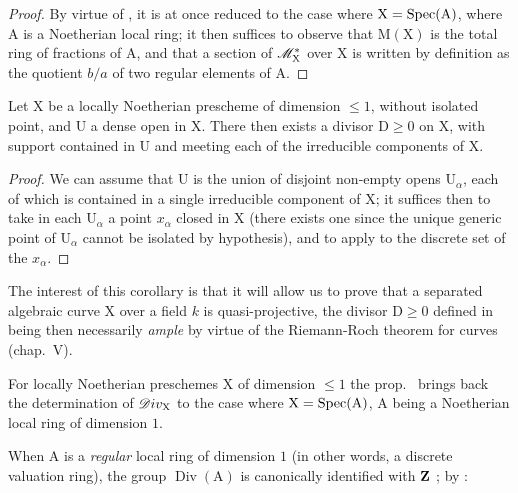 \begin{proof}
By virtue of , it is at once reduced to the case where $\mathrm{X}=\operatorname{Spec}(\mathrm{A})$, where $\mathrm{A}$ is a Noetherian local ring;
it then suffices to observe that $\mathrm{M}(\mathrm{X})$ is the total ring of fractions of $\mathrm{A}$, and that a section of $\mathscr{M}^*_\mathrm{X}$ over $\mathrm{X}$ is written by definition as the quotient $b/a$ of two regular elements of $\mathrm{A}$.
\end{proof}

\begin{corollary}[21.9.7]
\label{IV.21.9.7}
Let $\mathrm{X}$ be a locally Noetherian prescheme of dimension $\leq 1$, without isolated point, and $\mathrm{U}$ a dense open in $\mathrm{X}$.
There then exists a divisor $\mathrm{D}\geq 0$ on $\mathrm{X}$, with support contained in $\mathrm{U}$ and meeting each of the irreducible components of $\mathrm{X}$.
\end{corollary}

\begin{proof}
We can assume that $\mathrm{U}$ is the union of disjoint non-empty opens $\mathrm{U}_\alpha$, each of which is contained in a single irreducible component of $\mathrm{X}$;
it suffices then to take in each $\mathrm{U}_\alpha$ a point $x_\alpha$ closed in $\mathrm{X}$ (there exists one since the unique generic point of $\mathrm{U}_\alpha$ cannot be isolated by hypothesis), and to apply  to the discrete set of the $x_\alpha$.
\end{proof}

The interest of this corollary is that it will allow us to prove that a separated algebraic curve $\mathrm{X}$ over a field $k$ is quasi-projective, the divisor $\mathrm{D}\geq 0$ defined in  being then necessarily \emph{ample} by virtue of the Riemann-Roch theorem for curves (chap.~V).

\begin{env}[21.9.8]
\label{IV.21.9.8}
For locally Noetherian preschemes $\mathrm{X}$ of dimension $\leq 1$ the prop.~ brings back the determination of $\mathscr{D}iv_\mathrm{X}$ to the case where $\mathrm{X}=\operatorname{Spec}(\mathrm{A})$, $\mathrm{A}$ being a Noetherian local ring of dimension $1$.

When $\mathrm{A}$ is a \emph{regular} local ring of dimension $1$ (in other words, a discrete valuation ring), the group $\operatorname{Div}(\mathrm{A})$ is canonically identified with $\mathbf{Z}$ ;
by :
\end{env}

